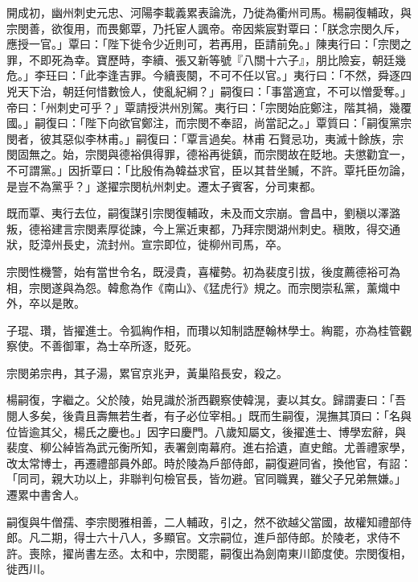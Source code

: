 \begin{pinyinscope}
 開成初，幽州刺史元忠、河陽李載義累表論洗，乃徙為衢州司馬。楊嗣復輔政，與宗閔善，欲復用，而畏鄭覃，乃托宦人諷帝。帝因紫宸對覃曰：「朕念宗閔久斥，應授一官。」覃曰：「陛下徙令少近則可，若再用，臣請前免。」陳夷行曰：「宗閔之罪，不即死為幸。寶歷時，李續、張又新等號『八關十六子』，朋比險妄，朝廷幾危。」李玨曰：「此李逢吉罪。今續喪闋，不可不任以官。」夷行曰：「不然，舜逐四兇天下治，朝廷何惜數憸人，使亂紀綱？」嗣復曰：「事當適宜，不可以憎愛奪。」帝曰：「州刺史可乎？」覃請授洪州別駕。夷行曰：「宗閔始庇鄭注，階其禍，幾覆國。」嗣復曰：「陛下向欲官鄭注，而宗閔不奉詔，尚當記之。」覃質曰：「嗣復黨宗閔者，彼其惡似李林甫。」嗣復曰：「覃言過矣。林甫石賢忌功，夷滅十餘族，宗閔固無之。始，宗閔與德裕俱得罪，德裕再徙鎮，而宗閔故在貶地。夫懲勸宜一，不可謂黨。」因折覃曰：「比殷侑為韓益求官，臣以其昔坐贓，不許。覃托臣勿論，是豈不為黨乎？」遂擢宗閔杭州刺史。遷太子賓客，分司東都。



 既而覃、夷行去位，嗣復謀引宗閔復輔政，未及而文宗崩。會昌中，劉稹以澤潞叛，德裕建言宗閔素厚從諫，今上黨近東都，乃拜宗閔湖州刺史。稹敗，得交通狀，貶漳州長史，流封州。宣宗即位，徙柳州司馬，卒。



 宗閔性機警，始有當世令名，既浸貴，喜權勢。初為裴度引拔，後度薦德裕可為相，宗閔遂與為怨。韓愈為作《南山》、《猛虎行》規之。而宗閔崇私黨，薰熾中外，卒以是敗。



 子琨、瓚，皆擢進士。令狐綯作相，而瓚以知制誥歷翰林學士。綯罷，亦為桂管觀察使。不善御軍，為士卒所逐，貶死。



 宗閔弟宗冉，其子湯，累官京兆尹，黃巢陷長安，殺之。



 楊嗣復，字繼之。父於陵，始見識於浙西觀察使韓滉，妻以其女。歸謂妻曰：「吾閱人多矣，後貴且壽無若生者，有子必位宰相。」既而生嗣復，滉撫其頂曰：「名與位皆逾其父，楊氏之慶也。」因字曰慶門。八歲知屬文，後擢進士、博學宏辭，與裴度、柳公綽皆為武元衡所知，表署劍南幕府。進右拾遺，直史館。尤善禮家學，改太常博士，再遷禮部員外郎。時於陵為戶部侍郎，嗣復避同省，換他官，有詔：「同司，親大功以上，非聯判句檢官長，皆勿避。官同職異，雖父子兄弟無嫌。」遷累中書舍人。



 嗣復與牛僧孺、李宗閔雅相善，二人輔政，引之，然不欲越父當國，故權知禮部侍郎。凡二期，得士六十八人，多顯官。文宗嗣位，進戶部侍郎。於陵老，求侍不許。喪除，擢尚書左丞。太和中，宗閔罷，嗣復出為劍南東川節度使。宗閔復相，徙西川。




\end{pinyinscope}
